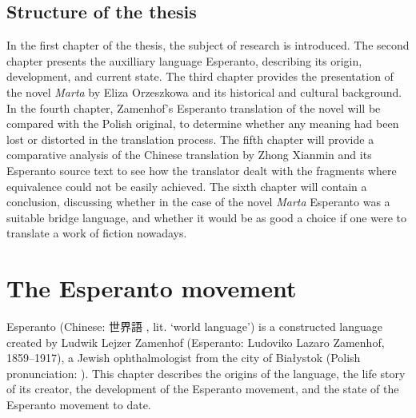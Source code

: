 \section{Structure of the thesis}
In the first chapter of the thesis, the subject of research is introduced.
The second chapter presents the auxilliary language Esperanto, describing its origin, development, and current state.
The third chapter provides the presentation of the novel \textit{Marta} by Eliza Orzeszkowa and its historical and cultural background.
In the fourth chapter, Zamenhof's Esperanto translation of the novel will be compared with the Polish original, to determine whether any meaning had been lost or distorted in the translation process.
The fifth chapter will provide a comparative analysis of the Chinese translation by Zhong Xianmin and its Esperanto source text to see how the translator dealt with the fragments where equivalence could not be easily achieved.
The sixth chapter will contain a conclusion, discussing whether in the case of the novel \textit{Marta} Esperanto was a suitable bridge language, and whether it would be as good a choice if one were to translate a work of fiction nowadays.


\chapter{The Esperanto movement}

Esperanto (Chinese: 世界語 , lit. `world language') is a constructed language created by Ludwik Lejzer Zamenhof (Esperanto: Ludoviko Lazaro Zamenhof, 1859--1917), a Jewish ophthalmologist from the city of Białystok (Polish pronunciation: \ipa{[bjaˈwɨstɔk]}).
This chapter describes the origins of the language, the life story of its creator, the development of the Esperanto movement, and the state of the Esperanto movement to date.

